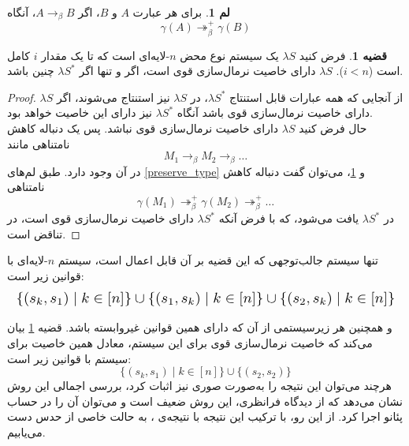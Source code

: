 \documentclass[11pt,twocolumn,a4paper,twoside]{article}
\theoremstyle{definition}
\theoremstyle{theorem}
\newtheorem{theorem}{قضیه}[section]
\theoremstyle{definition}
\newtheorem{lemma}{لم}[section]
\theoremstyle{definition}
\theoremstyle{definition}
\theoremstyle{definition}
\theoremstyle{definition}
\newcommand{\resizedalign}[1]{%
  \[
  \resizebox{\columnwidth}{!}{$
    \begin{aligned}
      #1
    \end{aligned}
  $}
  \]
}
\begin{document}
\begin{lemma}\label{preserve_reduction}
برای هر عبارت
$A$ و $B$، اگر $A \to_\beta B$، آنگاه
\vspace{-5pt}
\begin{equation*}
\gamma(A) \twoheadrightarrow^+_\beta \gamma(B)
\end{equation*}
\end{lemma}

\begin{theorem}\label{main_theorem}
فرض کنید
$\lambda S$
یک سیستم نوع محض
$n$-لایه‌ای
است که تا یک مقدار
$i$
کامل است ($i<n$).
$\lambda S$ دارای خاصیت نرمال‌سازی قوی است، اگر و تنها اگر $\lambda S^*$ چنین باشد.
\end{theorem}

\begin{proof}
از آنجایی که همه عبارات قابل استنتاج
$\lambda S^*$، در $\lambda S$ نیز استنتاج می‌شوند،
اگر $\lambda S$ دارای خاصیت نرمال‌سازی قوی باشد آنگاه $\lambda S^*$ نیز دارای این خاصیت خواهد بود.\\
حال فرض کنید
$\lambda S$ دارای خاصیت نرمال‌سازی قوی نباشد. پس یک دنباله کاهش نامتناهی مانند
\vspace{-5pt}
\begin{equation*}
M_1 \to_\beta M_2 \to_\beta \dots
\end{equation*}
در آن وجود دارد.
طبق لم‌های \ref{preserve_type} و \ref{preserve_reduction}، می‌توان گفت دنباله کاهش نامتناهی
\vspace{-5pt}
\begin{equation*}
\gamma(M_1) \twoheadrightarrow^+_\beta \gamma(M_2) \twoheadrightarrow^+_\beta \dots
\end{equation*}
در
$\lambda S^*$
یافت می‌شود، که با فرض آنکه
$\lambda S^*$
دارای خاصیت نرمال‌سازی قوی است، در تناقض است.
\end{proof}

تنها سیستم جالب‌توجهی که این قضیه بر آن قابل اعمال است، سیستم
$n$-لایه‌ای
با قوانین زیر است:
\vspace{-5pt}
\resizedalign{
\{(s_k,s_1) \mid k \in [n]\} \cup \{(s_1,s_k) \mid k \in [n]\} \cup \{(s_2,s_k) \mid k \in [n]\}    
}
و همچنین هر زیرسیستمی از آن که دارای همین قوانین غیروابسته باشد.
قضیه
\ref{main_theorem}
بیان می‌کند که خاصیت نرمال‌سازی قوی برای این سیستم، معادل همین خاصیت برای سیستم با قوانین زیر است:
\vspace{-5pt}
\begin{equation*}
\{(s_k,s_1) \mid k \in [n]\} \cup \{(s_2,s_2)\}
\end{equation*}
هرچند می‌توان این نتیجه را به‌صورت صوری نیز اثبات کرد، بررسی اجمالی این روش نشان می‌دهد که از دیدگاه فرا‌نظری، این روش ضعیف است و می‌توان آن را در حساب پئانو  اجرا کرد.
از این‌ رو، با ترکیب این نتیجه با نتیجه‌ی
\cite{barthe2001}،
به حالت خاصی از حدس
دست می‌یابیم.
\end{document}
